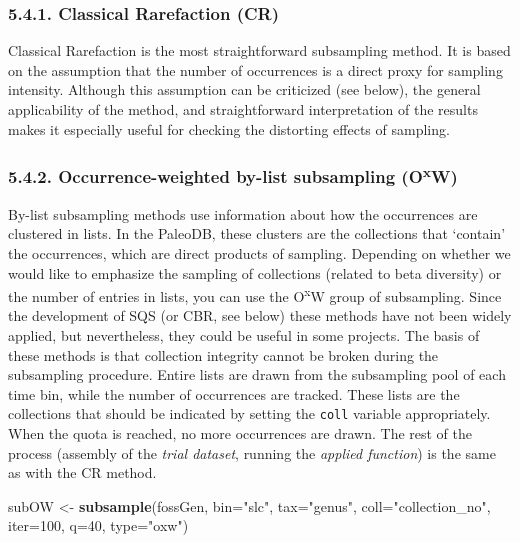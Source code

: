 \documentclass[]{article}
\newenvironment{Shaded}{\begin{snugshade}}{\end{snugshade}}
\newcommand{\DataTypeTok}[1]{\textcolor[rgb]{0.13,0.29,0.53}{#1}}
\newcommand{\DecValTok}[1]{\textcolor[rgb]{0.00,0.00,0.81}{#1}}
\newcommand{\KeywordTok}[1]{\textcolor[rgb]{0.13,0.29,0.53}{\textbf{#1}}}
\newcommand{\NormalTok}[1]{#1}
\newcommand{\StringTok}[1]{\textcolor[rgb]{0.31,0.60,0.02}{#1}}
\begin{document}
\hypertarget{classical-rarefaction-cr}{%
\subsubsection{5.4.1. Classical Rarefaction
(CR)}\label{classical-rarefaction-cr}}

Classical Rarefaction is the most straightforward subsampling method. It
is based on the assumption that the number of occurrences is a direct
proxy for sampling intensity. Although this assumption can be criticized
(see below), the general applicability of the method, and
straightforward interpretation of the results makes it especially useful
for checking the distorting effects of sampling.

\hypertarget{occurrence-weighted-by-list-subsampling-oxw}{%
\subsubsection{\texorpdfstring{5.4.2. Occurrence-weighted by-list
subsampling
(O\textsuperscript{x}W)}{5.4.2. Occurrence-weighted by-list subsampling (OxW)}}\label{occurrence-weighted-by-list-subsampling-oxw}}

By-list subsampling methods use information about how the occurrences
are clustered in lists. In the PaleoDB, these clusters are the
collections that `contain' the occurrences, which are direct products of
sampling. Depending on whether we would like to emphasize the sampling
of collections (related to beta diversity) or the number of entries in
lists, you can use the O\textsuperscript{x}W group of subsampling. Since
the development of SQS (or CBR, see below) these methods have not been
widely applied, but nevertheless, they could be useful in some projects.
The basis of these methods is that collection integrity cannot be broken
during the subsampling procedure. Entire lists are drawn from the
subsampling pool of each time bin, while the number of occurrences are
tracked. These lists are the collections that should be indicated by
setting the \texttt{coll} variable appropriately. When the quota is
reached, no more occurrences are drawn. The rest of the process
(assembly of the \emph{trial dataset}, running the \emph{applied
function}) is the same as with the CR method.

\begin{Shaded}
\begin{Highlighting}[]
\NormalTok{subOW <-}\StringTok{ }\KeywordTok{subsample}\NormalTok{(fossGen, }\DataTypeTok{bin=}\StringTok{"slc"}\NormalTok{, }\DataTypeTok{tax=}\StringTok{"genus"}\NormalTok{, }\DataTypeTok{coll=}\StringTok{"collection_no"}\NormalTok{,}
  \DataTypeTok{iter=}\DecValTok{100}\NormalTok{, }\DataTypeTok{q=}\DecValTok{40}\NormalTok{, }\DataTypeTok{type=}\StringTok{"oxw"}\NormalTok{)}
\end{Highlighting}
\end{Shaded}
\end{document}
